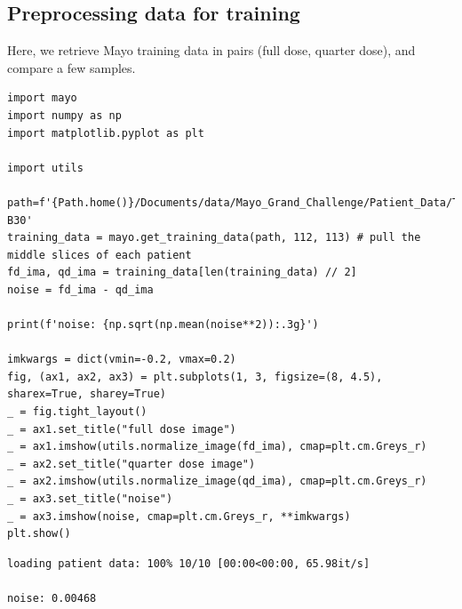 \documentclass[a4paper, 11pt]{article}
\begin{document}
\subsection{Preprocessing data for training}
\label{sec:org12845e9}
Here, we retrieve Mayo training data in pairs (full dose, quarter dose), and compare a few samples.
\begin{verbatim}
import mayo
import numpy as np
import matplotlib.pyplot as plt

import utils

path=f'{Path.home()}/Documents/data/Mayo_Grand_Challenge/Patient_Data/Training_Image_Data/3mm B30'
training_data = mayo.get_training_data(path, 112, 113) # pull the middle slices of each patient
fd_ima, qd_ima = training_data[len(training_data) // 2]
noise = fd_ima - qd_ima

print(f'noise: {np.sqrt(np.mean(noise**2)):.3g}')

imkwargs = dict(vmin=-0.2, vmax=0.2)
fig, (ax1, ax2, ax3) = plt.subplots(1, 3, figsize=(8, 4.5), sharex=True, sharey=True)
_ = fig.tight_layout()
_ = ax1.set_title("full dose image")
_ = ax1.imshow(utils.normalize_image(fd_ima), cmap=plt.cm.Greys_r)
_ = ax2.set_title("quarter dose image")
_ = ax2.imshow(utils.normalize_image(qd_ima), cmap=plt.cm.Greys_r)
_ = ax3.set_title("noise")
_ = ax3.imshow(noise, cmap=plt.cm.Greys_r, **imkwargs)
plt.show()

\end{verbatim}

\begin{verbatim}
loading patient data: 100% 10/10 [00:00<00:00, 65.98it/s]

noise: 0.00468
\end{verbatim}
\end{document}
